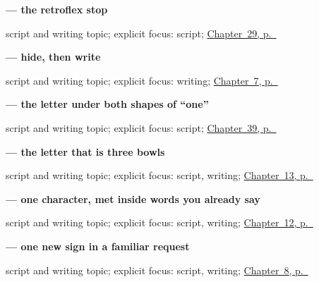 \noindent\begin{minipage}[t]{\linewidth}
\raggedright
\textbf{ — the retroflex stop}\par
\footnotesize script and writing topic; explicit focus: script; \hyperref[ch:ta-good-morning]{Chapter~29, p.~\pageref*{ch:ta-good-morning}}
\end{minipage}\par\smallskip

\noindent\begin{minipage}[t]{\linewidth}
\raggedright
\textbf{ — hide, then write}\par
\footnotesize script and writing topic; explicit focus: writing; \hyperref[ch:ta-numbers-one-to-ten]{Chapter~7, p.~\pageref*{ch:ta-numbers-one-to-ten}}
\end{minipage}\par\smallskip

\noindent\begin{minipage}[t]{\linewidth}
\raggedright
\textbf{ — the letter under both shapes of \textquotedblleft{}one\textquotedblright{}}\par
\footnotesize script and writing topic; explicit focus: script; \hyperref[ch:ta-asking-for-what-you-want]{Chapter~39, p.~\pageref*{ch:ta-asking-for-what-you-want}}
\end{minipage}\par\smallskip

\noindent\begin{minipage}[t]{\linewidth}
\raggedright
\textbf{ — the letter that is three bowls}\par
\footnotesize script and writing topic; explicit focus: script, writing; \hyperref[ch:ta-body-parts]{Chapter~13, p.~\pageref*{ch:ta-body-parts}}
\end{minipage}\par\smallskip

\noindent\begin{minipage}[t]{\linewidth}
\raggedright
\textbf{ — one character, met inside words you already say}\par
\footnotesize script and writing topic; explicit focus: script, writing; \hyperref[ch:ta-family]{Chapter~12, p.~\pageref*{ch:ta-family}}
\end{minipage}\par\smallskip

\noindent\begin{minipage}[t]{\linewidth}
\raggedright
\textbf{ — one new sign in a familiar request}\par
\footnotesize script and writing topic; explicit focus: script, writing; \hyperref[ch:ta-please]{Chapter~8, p.~\pageref*{ch:ta-please}}
\end{minipage}\par\smallskip

